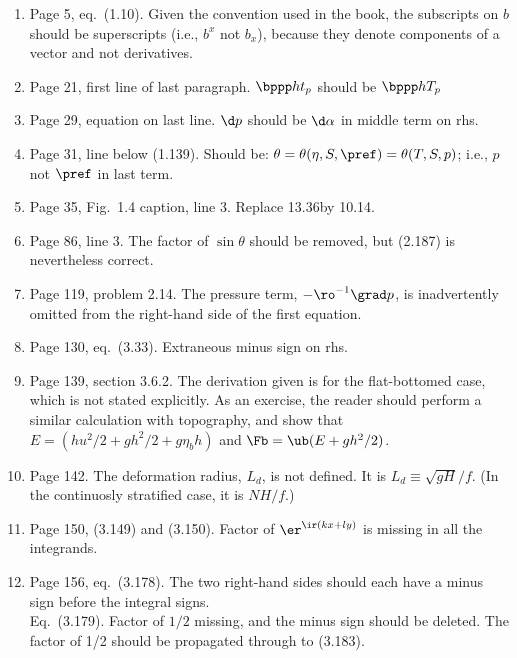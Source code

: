 \documentclass[10pt]{article}
\newcommand{\eq}{eq.\ } \newcommand{\Eq}{Eq.\ }
\begin{document}
\begin{enumerate}

\item Page 5, \eq (1.10).  Given the  convention used in the book, the subscripts on $b$ should be superscripts (i.e., $b^x$ not $b_x$), because they denote components of a vector and not derivatives. 

\item Page 21, first line of last paragraph. $\bppp h t _p$ should be $\bppp hT_p$


\item Page 29, equation on last line. $\d p$ should be $\d \alpha$ in middle term on rhs.

\item Page 31, line below (1.139). Should be: $\theta = \theta(\eta, S, \pref) = \theta (T, S, p)$; i.e., $p$ not $\pref$ in last term.

\item Page 35, Fig.\ 1.4 caption, line 3. Replace 13.36\dgc by 10.14\dgc. 

\item Page 86, line 3. The factor of $\sin \theta$ should be removed, but (2.187) is nevertheless correct.

\item Page 119, problem 2.14. The pressure term, $-\ro^{-1} \grad p$, is inadvertently omitted from the right-hand side of the first equation. 

\item Page 130, \eq (3.33). Extraneous minus sign on rhs.

\item Page 139, section 3.6.2. The derivation given is for the flat-bottomed case, which is not stated explicitly. As an exercise, the reader should perform a similar calculation with topography, and show that $E = (h u^2/2 + g h^2/2 + g \eta_b h)$ and $\Fb = \ub( E + g h^2/2)$.  

\item Page 142. The deformation radius, $L_d$, is not defined. It is $L_d \equiv \sqrt{gH}/f$. (In the continuosly stratified case, it is $NH/f$.)

\item Page 150, (3.149) and (3.150). Factor of $\er^{\ir (kx + ly)}$ is missing in all the integrands. 

\item Page 156, \eq (3.178). The two right-hand sides should each have a minus sign before the integral signs. \\
\Eq (3.179). Factor of $1/2$ missing, and the minus sign should be deleted. The factor of 1/2 should be propagated through to (3.183). 


\end{enumerate}
\end{document}
